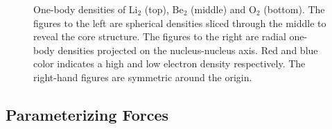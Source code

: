 \begin{figure}[h]
\begin{center}
  \caption{One-body densities of $\mathrm{Li_2}$ (top), $\mathrm{Be_2}$ (middle) and $\mathrm{O_2}$ (bottom). The figures to the left are spherical densities sliced through the middle to reveal the core structure. The figures to the right are radial one-body densities projected on the nucleus-nucleus axis. Red and blue color indicates a high and low electron density respectively. The right-hand figures are symmetric around the origin.}
  \label{fig:OBD_Molecules}
 \end{center}
\end{figure}
\renewcommand\floatpagefraction{.7}

\clearpage
\subsection{Parameterizing Forces}

